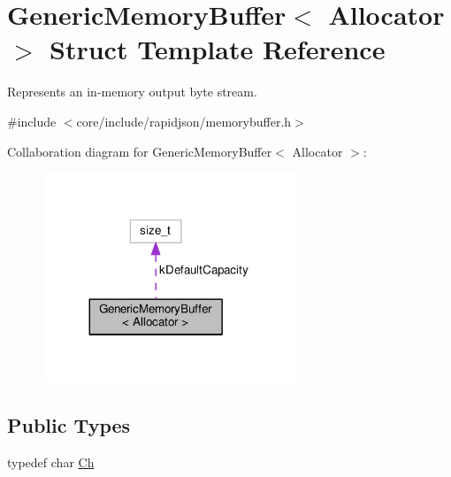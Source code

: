 \hypertarget{structGenericMemoryBuffer}{}\section{Generic\+Memory\+Buffer$<$ Allocator $>$ Struct Template Reference}
\label{structGenericMemoryBuffer}


Represents an in-\/memory output byte stream.  




{\ttfamily \#include $<$core/include/rapidjson/memorybuffer.\+h$>$}



Collaboration diagram for Generic\+Memory\+Buffer$<$ Allocator $>$\+:
\nopagebreak
\begin{figure}[H]
\begin{center}
\leavevmode
\includegraphics[width=215pt]{structGenericMemoryBuffer__coll__graph}
\end{center}
\end{figure}
\subsection*{Public Types}
\begin{DoxyCompactItemize}
\item 
typedef char \hyperlink{structGenericMemoryBuffer_a212f137abfd8bce2ad216b2d960c027f}{Ch}
\end{DoxyCompactItemize}
